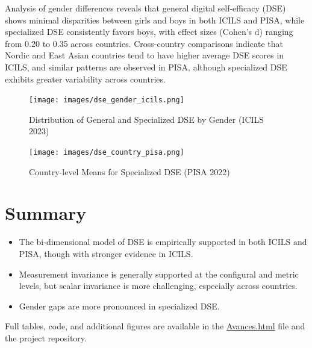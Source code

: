\documentclass[
  letterpaper,
  DIV=11,
  numbers=noendperiod]{scrartcl}
\providecommand{\tightlist}{%
  \setlength{\itemsep}{0pt}\setlength{\parskip}{0pt}}\usepackage{longtable,booktabs,array}
\begin{document}
Analysis of gender differences reveals that general digital
self-efficacy (DSE) shows minimal disparities between girls and boys in
both ICILS and PISA, while specialized DSE consistently favors boys,
with effect sizes (Cohen's d) ranging from 0.20 to 0.35 across
countries. Cross-country comparisons indicate that Nordic and East Asian
countries tend to have higher average DSE scores in ICILS, and similar
patterns are observed in PISA, although specialized DSE exhibits greater
variability across countries.

\begin{figure}[H]

{\centering \texttt{[image: images/dse\_gender\_icils.png]}

}

\caption{Distribution of General and Specialized DSE by Gender (ICILS
2023)}

\end{figure}%
\begin{figure}[H]

{\centering \texttt{[image: images/dse\_country\_pisa.png]}

}

\caption{Country-level Means for Specialized DSE (PISA 2022)}

\end{figure}%

\section{Summary}\label{summary}

\begin{itemize}
\tightlist
\item
  The bi-dimensional model of DSE is empirically supported in both ICILS
  and PISA, though with stronger evidence in ICILS.
\item
  Measurement invariance is generally supported at the configural and
  metric levels, but scalar invariance is more challenging, especially
  across countries.
\item
  Gender gaps are more pronounced in specialized DSE.
\end{itemize}

Full tables, code, and additional figures are available in the
\url{Avances.html} file and the project repository.
\end{document}
